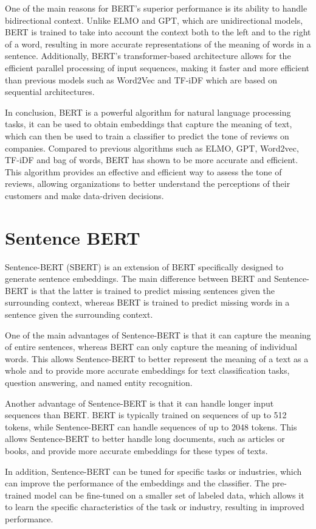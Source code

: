 \documentclass[PI]{ProjectProposal}
\begin{document}
One of the main reasons for BERT's superior performance is its ability to handle bidirectional context. Unlike ELMO and GPT, which are unidirectional models, BERT is trained to take into account the context both to the left and to the right of a word, resulting in more accurate representations of the meaning of words in a sentence. Additionally, BERT's transformer-based architecture allows for the efficient parallel processing of input sequences, making it faster and more efficient than previous models such as Word2Vec and TF-iDF which are based on sequential architectures.

In conclusion, BERT is a powerful algorithm for natural language processing tasks, it can be used to obtain embeddings that capture the meaning of text, which can then be used to train a classifier to predict the tone of reviews on companies. Compared to previous algorithms such as ELMO, GPT, Word2vec, TF-iDF and bag of words, BERT has shown to be more accurate and efficient. This algorithm provides an effective and efficient way to assess the tone of reviews, allowing organizations to better understand the perceptions of their customers and make data-driven decisions.
\section{Sentence BERT}
\label{sec:org386ff3b}
Sentence-BERT (SBERT) is an extension of BERT specifically designed to generate sentence embeddings. The main difference between BERT and Sentence-BERT is that the latter is trained to predict missing sentences given the surrounding context, whereas BERT is trained to predict missing words in a sentence given the surrounding context.

One of the main advantages of Sentence-BERT is that it can capture the meaning of entire sentences, whereas BERT can only capture the meaning of individual words. This allows Sentence-BERT to better represent the meaning of a text as a whole and to provide more accurate embeddings for text classification tasks, question answering, and named entity recognition.

Another advantage of Sentence-BERT is that it can handle longer input sequences than BERT. BERT is typically trained on sequences of up to 512 tokens, while Sentence-BERT can handle sequences of up to 2048 tokens. This allows Sentence-BERT to better handle long documents, such as articles or books, and provide more accurate embeddings for these types of texts.

In addition, Sentence-BERT can be tuned for specific tasks or industries, which can improve the performance of the embeddings and the classifier. The pre-trained model can be fine-tuned on a smaller set of labeled data, which allows it to learn the specific characteristics of the task or industry, resulting in improved performance.
\end{document}
